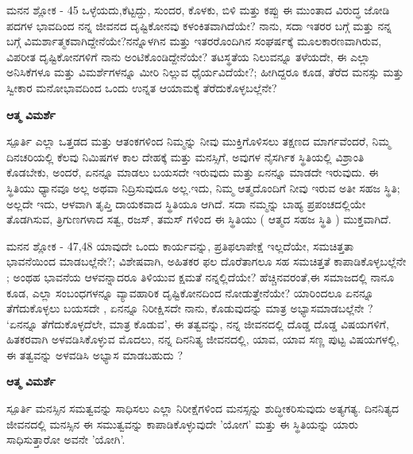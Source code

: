 \begin{mananam}{\mananamfont ಮನನ ಶ್ಲೋಕ - \textenglish{45}}
\footnotesize \mananamtext ಒಳ್ಳೆಯದು,ಕೆಟ್ಟದ್ದು, ಸುಂದರ, ಕೊಳಕು, ಬಿಳಿ ಮತ್ತು ಕಪ್ಪು ಈ ಮುಂತಾದ ವಿರುದ್ಧ ಜೋಡಿ ಪದಗಳ ಭಾವದಿಂದ ನನ್ನ ಜೀವನದ ದೃಷ್ಟಿಕೋನವು ಕಳಂಕಿತವಾಗಿದೆಯೇ? ನಾನು, ಸದಾ ಇತರರ ಬಗ್ಗೆ ಮತ್ತು ನನ್ನ ಬಗ್ಗೆ ವಿಮರ್ಶಾತ್ಮಕವಾಗಿದ್ದೇನೆಯೇ?ನನ್ನೊಳಗಿನ ಮತ್ತು ಇತರರೊಂದಿಗಿನ  ಸಂಘರ್ಷಕ್ಕೆ ಮೂಲಕಾರಣವಾಗಿರುವ, ವಿಪರೀತ ದೃಷ್ಟಿಕೋನಗಳಿಗೆ ನಾನು ಅಂಟಿಕೊಂಡಿದ್ದೇನೆಯೇ? ತಟಸ್ಥತೆಯ ನಿಲುವನ್ನೂ ತಳೆಯದೇ, ಈ ಎಲ್ಲಾ ಅನಿಸಿಕೆಗಳೂ ಮತ್ತು ವಿಮರ್ಶೆಗಳನ್ನೂ ಮೀರಿ ನಿಲ್ಲುವ ಧೈರ್ಯವಿದೆಯೇ?; ಹೀಗಿದ್ದರೂ ಕೂಡ,  ತೆರೆದ ಮನಸ್ಸು ಮತ್ತು ಸ್ವೀಕಾರ ಮನೋಭಾವದಿಂದ ಒಂದು ಉನ್ನತ ಆಯಾಮಕ್ಕೆ ತೆರೆದುಕೊಳ್ಳಬಲ್ಲೆನೇ?
\end{mananam}
\WritingHand\enspace\textbf{ಆತ್ಮ ವಿಮರ್ಶೆ}
\begin{inspiration}{\mananamfont ಸ್ಪೂರ್ತಿ}
\footnotesize \mananamtext ಎಲ್ಲಾ ಒತ್ತಡದ ಮತ್ತು ಆತಂಕಗಳಿಂದ ನಿಮ್ಮನ್ನು ನೀವು ಮುಕ್ತಿಗೊಳಿಸಲು ತಕ್ಷಣದ ಮಾರ್ಗವೆಂದರೆ, ನಿಮ್ಮ ದಿನಚರಿಯಲ್ಲಿ ಕೆಲವು ನಿಮಿಷಗಳ ಕಾಲ ದೇಹಕ್ಕೆ ಮತ್ತು ಮನಸ್ಸಿಗೆ, ಅವುಗಳ ನೈಸರ್ಗಿಕ ಸ್ಥಿತಿಯಲ್ಲಿ ವಿಶ್ರಾಂತಿ ಕೊಡಬೇಕು,  ಅಂದರೆ,  ಏನನ್ನೂ ಮಾಡಲು ಬಯಸದೇ ಇರುವುದು ಮತ್ತು ಏನನ್ನೂ ಮಾಡದೇ ಇರುವುದು. ಈ ಸ್ಥಿತಿಯು ಧ್ಯಾನವೂ ಅಲ್ಲ ಅಥವಾ ನಿದ್ರಿಸುವುದೂ ಅಲ್ಲ.ಇದು, ನಿಮ್ಮ ಆತ್ಮದೊಂದಿಗೆ ನೀವು ಇರುವ ಅತೀ ಸಹಜ ಸ್ಥಿತಿ;   ಅಲ್ಲದೇ ಇದು, ಆಳವಾಗಿ ತೃಪ್ತಿ ದಾಯಕವಾದ ಸ್ಥಿತಿಯೂ ಆಗಿದೆ. ಸದಾ ನಮ್ಮನ್ನು ಬಾಹ್ಯ ಪ್ರಪಂಚದಲ್ಲಿಯೇ ತೊಡಗಿಸುವ, ತ್ರಿಗುಣಗಳಾದ ಸತ್ವ, ರಜಸ್, ತಮಸ್ ಗಳಿಂದ ಈ ಸ್ಥಿತಿಯು ( ಆತ್ಮದ ಸಹಜ ಸ್ಥಿತಿ ) ಮುಕ್ತವಾಗಿದೆ. 
\end{inspiration}
\newpage

\newpage
\begin{mananam}{\mananamfont ಮನನ ಶ್ಲೋಕ - \textenglish{47,48}}
\footnotesize \mananamtext ಯಾವುದೇ ಒಂದು ಕಾರ್ಯವನ್ನು, ಪ್ರತಿಫಲಾಪೇಕ್ಷೆ ಇಲ್ಲದೆಯೇ, ಸಮಚಿತ್ತತಾ ಭಾವನೆಯಿಂದ  ಮಾಡಬಲ್ಲೆನೇ?; ವಿಶೇಷವಾಗಿ,  ಅಹಿತಕರ ಫಲ ದೊರೆತಾಗಲೂ ಸಹ ಸಮಚಿತ್ತತೆ ಕಾಪಾಡಿಕೊಳ್ಳಬಲ್ಲೆನೇ ; ಅಂಥಹ ಭಾವನೆಯ ಆಳವನ್ನಾದರೂ ತಿಳಿಯುವ ಕ್ಷಮತೆ ನನ್ನಲ್ಲಿದೆಯೇ? ಹೆಚ್ಚಿನವರಂತೆ,ಈ ಸಮಾಜದಲ್ಲಿ ನಾನೂ ಕೂಡ, ಎಲ್ಲಾ ಸಂಬಂಧಗಳನ್ನೂ ವ್ಯಾವಹಾರಿಕ ದೃಷ್ಟಿಕೋನದಿಂದ ನೋಡುತ್ತೇನೆಯೇ? ಯಾರಿಂದಲೂ ಏನನ್ನೂ ತೆಗೆದುಕೊಳ್ಳಲು ಬಯಸದೇ , ಏನನ್ನೂ ನಿರೀಕ್ಷಿಸದೇ ನಾನು,  ಕೊಡುವುದನ್ನು ಮಾತ್ರ ಅಭ್ಯಾಸಮಾಡಬಲ್ಲೆನೇ ? ‘ಏನನ್ನೂ ತೆಗೆದುಕೊಳ್ಳದೆಲೇ, ಮಾತ್ರ ಕೊಡುವ’,  ಈ ತತ್ವವನ್ನು, ನನ್ನ ಜೀವನದಲ್ಲಿ ದೊಡ್ಡ ದೊಡ್ಡ ವಿಷಯಗಳಿಗೆ, ಹಿತಕರವಾಗಿ ಅಳವಡಿಸಿಕೊಳ್ಳುವ  ಮೊದಲು, ನನ್ನ ದಿನನಿತ್ಯ ಜೀವನದಲ್ಲಿ, ಯಾವ, ಯಾವ ಸಣ್ಣ ಪುಟ್ಟ ವಿಷಯಗಳಲ್ಲಿ, ಈ ತತ್ವವನ್ನು ಅಳವಡಿಸಿ ಅಭ್ಯಾಸ ಮಾಡಬಹುದು ? 
\end{mananam}
\WritingHand\enspace\textbf{ಆತ್ಮ ವಿಮರ್ಶೆ}
\begin{inspiration}{\mananamfont ಸ್ಪೂರ್ತಿ}
\footnotesize \mananamtext ಮನಸ್ಸಿನ ಸಮತ್ವವನ್ನು ಸಾಧಿಸಲು ಎಲ್ಲಾ ನಿರೀಕ್ಷೆಗಳಿಂದ ಮನಸ್ಸನ್ನು ಶುದ್ಧೀಕರಿಸುವುದು ಅತ್ಯಗತ್ಯ. ದಿನನಿತ್ಯದ ಜೀವನದಲ್ಲಿ ಮನಸ್ಸಿನ ಈ ಸಮುತ್ವವನ್ನು ಕಾಪಾಡಿಕೊಳ್ಳುವುದೇ 'ಯೋಗ' ಮತ್ತು ಈ ಸ್ಥಿತಿಯನ್ನು ಯಾರು ಸಾಧಿಸುತ್ತಾರೋ ಅವನೇ 'ಯೋಗಿ'.
\end{inspiration}
\newpage

